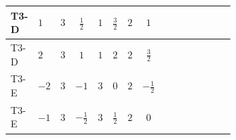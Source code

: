 \documentclass[8pt]{article}
\begin{document}
\begin{landscape}
\begin{longtable}{@{}llcccccc >{\raggedright\arraybackslash}p{0.21\linewidth} >{\raggedright\arraybackslash}p{0.21\linewidth} >{\raggedright\arraybackslash}p{0.21\linewidth}@{}}
\midrule
T3-D & $1$ & $3$ & $\frac{1}{2}$ & $1$ & $\frac{3}{2}$ & $2$ & $1$ & \scriptsize\adjustbox{max width=\linewidth}{$\begin{gathered} - 3 C_{5} g_{2}^{2}\end{gathered}$} & \scriptsize\adjustbox{max width=\linewidth}{$\begin{gathered} 2 C_{5} \lambda_1\end{gathered}$} & \scriptsize\adjustbox{max width=\linewidth}{$\begin{gathered} - C_{5} Y_e Y_e^\dagger\end{gathered}$} \\
\midrule
T3-D & $2$ & $3$ & $1$ & $1$ & $2$ & $2$ & $\frac{3}{2}$ & \scriptsize\adjustbox{max width=\linewidth}{$\begin{gathered} - 3 C_{5} g_{2}^{2}\end{gathered}$} & \scriptsize\adjustbox{max width=\linewidth}{$\begin{gathered} 2 C_{5} \lambda_1\end{gathered}$} & \scriptsize\adjustbox{max width=\linewidth}{$\begin{gathered} - C_{5} Y_e Y_e^\dagger\end{gathered}$} \\
\midrule
T3-E & $-2$ & $3$ & $-1$ & $3$ & $0$ & $2$ & $-\frac{1}{2}$ & \scriptsize\adjustbox{max width=\linewidth}{$\begin{gathered} - 3 C_{5} g_{2}^{2}\end{gathered}$} & \scriptsize\adjustbox{max width=\linewidth}{$\begin{gathered} 2 C_{5} \lambda_1\end{gathered}$} & \scriptsize\adjustbox{max width=\linewidth}{$\begin{gathered} - C_{5} Y_e Y_e^\dagger\end{gathered}$} \\
\midrule
T3-E & $-1$ & $3$ & $-\frac{1}{2}$ & $3$ & $\frac{1}{2}$ & $2$ & $0$ & \scriptsize\adjustbox{max width=\linewidth}{$\begin{gathered} - 3 C_{5} g_{2}^{2}\end{gathered}$} & \scriptsize\adjustbox{max width=\linewidth}{$\begin{gathered} 2 C_{5} \lambda_1\end{gathered}$} & \scriptsize\adjustbox{max width=\linewidth}{$\begin{gathered} - C_{5} Y_e Y_e^\dagger\end{gathered}$} \\

\end{longtable}
\end{landscape}
\end{document}
